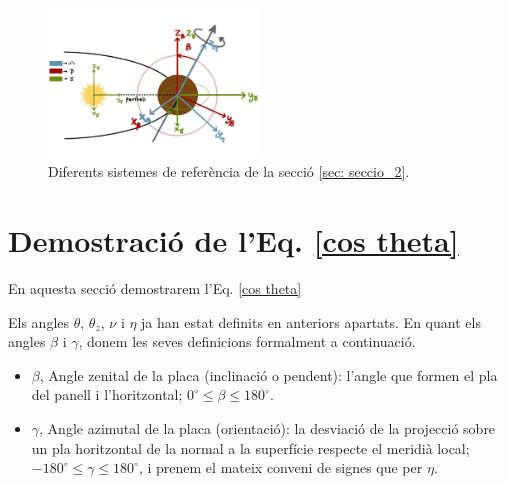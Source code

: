 \documentclass[11pt]{article}
\begin{document}
\begin{figure}[hbt]
    \centering
    \includegraphics[width=0.5\textwidth]{sist_ref.PNG}
    \caption{Diferents sistemes de referència de la secció \ref{sec: seccio_2}.}
    \label{fig: sist_ref}
\end{figure}

\section{Demostració de l'Eq. \eqref{cos theta}}
\label{sec: demo cos theta}
En aquesta secció demostrarem l'Eq. \eqref{cos theta}

Els angles $\theta$, $\theta_z$, $\nu$ i $\eta$ ja han estat definits en anteriors apartats. En quant els angles $\beta$ i $\gamma$, donem les seves definicions formalment a continuació.
\begin{itemize}
    \item $\beta$, Angle zenital de la placa (inclinació o pendent): l'angle que formen el pla del panell i l'horitzontal; $0^\circ \leq \beta \leq 180^\circ$.
    \item $\gamma$, Angle azimutal de la placa (orientació): la desviació de la projecció sobre un pla horitzontal de la normal a la superfície respecte el meridià local; $-180^\circ \leq \gamma \leq 180^\circ$, i prenem el mateix conveni de signes que per $\eta$.
\end{itemize}
\end{document}
